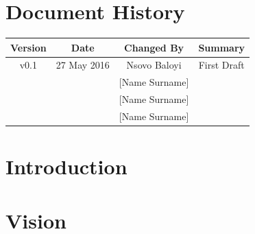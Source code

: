 \documentclass[a4paper,12pt, margin=1.5in]{article}
\begin{document}
	\newpage
	
	\tableofcontents
	\newpage
	\section*{Document History}
	
	\begin{table}[h!]
		
		\centering %
		\begin{tabular}{c c c c} %
			\hline\hline %
			Version & Date & Changed By & Summary \\ [0.5ex] %
			\hline %
			v0.1 & 27 May 2016 & Nsovo Baloyi & First Draft 
			\\ & & [Name Surname] &  
			\\ & & [Name Surname] &
			\\ & & [Name Surname] & \\ [1ex] 
			\hline
		\end{tabular}
		\label{table:nonlin} %
	\end{table}

	\newpage
	
	\section{Introduction}	
	
	\section{Vision}	
	
	
\end{document}
